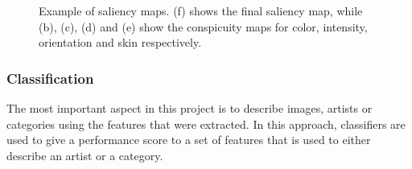 \begin{figure}[h!]

\caption{Example of saliency maps. (f) shows the final saliency map, while (b), (c), (d) and (e) show the conspicuity maps for color, intensity, orientation and skin respectively.}
\end{figure}


\subsubsection{Classification}


The most important aspect in this project is to describe images, artists or categories using the features that were extracted.
In this approach, classifiers are used to give a performance score to a set of features that is used to either describe an artist or a category.

